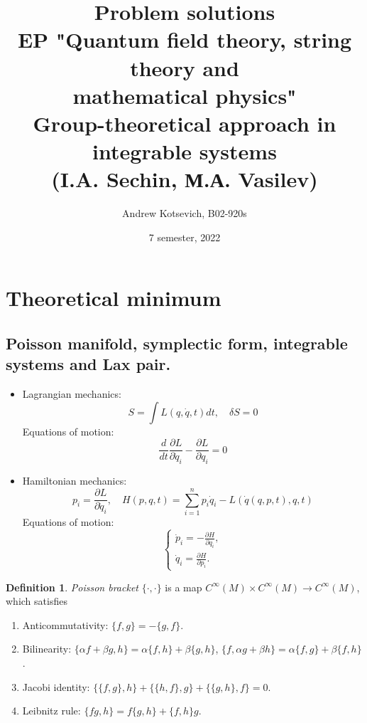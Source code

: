 \documentclass[12pt]{article}
\title{Problem solutions\\
EP "Quantum field theory, string theory and\\
mathematical physics"\\[2cm]
Group-theoretical approach in integrable systems\\ (I.A. Sechin, М.А. Vasilev)}
\author{Andrew Kotsevich, B02-920s}
\date{7 semester, 2022}
\theoremstyle{definition}
\newtheorem{defin}{Definition}[]
\begin{document}
\maketitle
\newpage
\tableofcontents
\newpage
\section*{Theoretical minimum}
\subsection*{Poisson manifold, symplectic form, integrable systems and Lax pair.}
\begin{itemize}
    \item Lagrangian mechanics:
    \begin{equation}
        S=\int L(q,\dot{q},t)dt,\quad \delta S=0
    \end{equation}
    Equations of motion:
    \begin{equation}
        \frac{d}{dt}\frac{\partial L}{\partial\dot{q}_i}-\frac{\partial L}{\partial q_i}=0
    \end{equation}
    \item Hamiltonian mechanics:
    \begin{equation}
        p_i=\frac{\partial L}{\partial\dot{q}_i},\quad H(p,q,t)=\sum\limits_{i=1}^np_i\dot{q}_i-L(\dot{q}(q,p,t),q,t)
    \end{equation}
    Equations of motion:
    \begin{equation}
        \begin{cases}
            \dot{p}_i=-\frac{\partial H}{\partial q_i},\\
            \dot{q}_i=\frac{\partial H}{\partial p_i}.
        \end{cases}
    \end{equation}
\end{itemize}
\begin{defin}
    \textit{Poisson bracket} $\{\bm{\cdot},\bm{\cdot}\}$ is a map $C^\infty(M)\times C^\infty(M)\rightarrow C^\infty(M)$, which satisfies
    \begin{enumerate}
        \item Anticommutativity: $\{f,g\}=-\{g,f\}$.
        \item Bilinearity: $\{\alpha f+\beta g,h\}=\alpha\{f,h\}+\beta\{g,h\}$, $\{f,\alpha g+\beta h\}=\alpha\{f,g\}+\beta\{f,h\}$.
        \item Jacobi identity: $\{\{f,g\},h\}+\{\{h,f\},g\}+\{\{g,h\},f\}=0$.
        \item Leibnitz rule: $\{fg,h\}=f\{g,h\}+\{f,h\}g$.
    \end{enumerate}
\end{defin}
\end{document}

